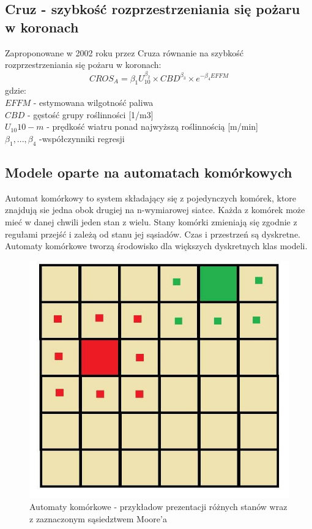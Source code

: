 \documentclass[a4paper, 11pt]{article}
\begin{document}
	\subsection{Cruz - szybkość rozprzestrzeniania się pożaru w koronach}
	\indent
	Zaproponowane w 2002 roku przez Cruza równanie na szybkość rozprzestrzeniania się pożaru w koronach: 
	$$
	CROS_A=\beta_1U^{\beta_2}_10 \times CBD^{\beta_3} \times e^{-\beta_4EFFM}
	$$
	gdzie: \\
	$EFFM$ - estymowana wilgotność paliwa \\
	$CBD$ - gęstość grupy roślinności [1/m3]\\
	$U_10  10-m$ - prędkość wiatru ponad najwyższą roślinnością [m/min]\\
	$\beta_1, ...,\beta_4$ -współczynniki regresji\\
	\subsection{Modele oparte na automatach komórkowych}	
	\indent
	
	Automat komórkowy to system składający się z pojedynczych komórek, ktore znajdują sie jedna obok drugiej na n-wymiarowej siatce. Każda z komórek może mieć w danej chwili jeden stan z wielu. Stany komórki zmieniają się zgodnie z regułami przejść i zależą od stanu jej sąsiadów. Czas i przestrzeń są dyskretne.\\
	
	Automaty komórkowe tworzą środowisko dla większych dyskretnych klas modeli.
	\begin{figure}[H]
		\centerline{\includegraphics[scale=0.4]{automaty}}
		\raggedright{	\caption{Automaty komórkowe - przykładow prezentacji różnych stanów wraz z zaznaczonym sąsiedztwem Moore'a}}
	\end{figure}
	
\end{document}
